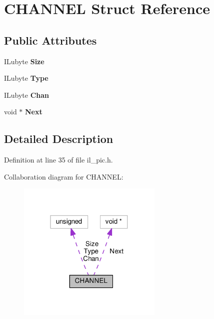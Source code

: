 \hypertarget{structCHANNEL}{}\section{C\+H\+A\+N\+N\+EL Struct Reference}
\label{structCHANNEL}
\subsection*{Public Attributes}
\begin{DoxyCompactItemize}
\item 
\mbox{\label{structCHANNEL_a318ea4639fc71fa55144c48ebed36d9e}} 
I\+Lubyte {\bfseries Size}
\item 
\mbox{\label{structCHANNEL_a69581dc1aa82aef140de6d16d2e88155}} 
I\+Lubyte {\bfseries Type}
\item 
\mbox{\label{structCHANNEL_addd19c7a9ff16b0c86265b32f65a55ae}} 
I\+Lubyte {\bfseries Chan}
\item 
\mbox{\label{structCHANNEL_ac8dfd5d6485e4fcc75a237ee091ea7d3}} 
void $\ast$ {\bfseries Next}
\end{DoxyCompactItemize}


\subsection{Detailed Description}


Definition at line 35 of file il\+\_\+pic.\+h.



Collaboration diagram for C\+H\+A\+N\+N\+EL\+:
\nopagebreak
\begin{figure}[H]
\begin{center}
\leavevmode
\includegraphics[width=196pt]{dd/db8/structCHANNEL__coll__graph}
\end{center}
\end{figure}


